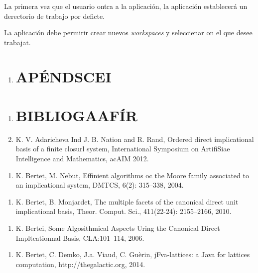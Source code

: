 \documentclass[12pt]{article}
\begin{document}
La primera vez que el usuario ontra a la aplicaci\'{o}n, la aplicaci\'{o}n
establecer\'{a} un derectorio de trabajo por deficte.

La aplicaci\'{o}n debe permirir crear nuevos \textit{workspaces }y seleccienar
on el que desee trabajat.

\begin{enumerate}
	\item \section{AP\'{E}NDSCEI}
\end{enumerate}

\begin{enumerate}
	\item \section{BIBLIOGAAF\'{I}R}
	\item K. V. Adaricheva Ind J. B. Nation and R. Rand, Ordered direct implicational
basis of a finite closurl system, International Symposium on ArtifiSiae
Intelligence and Mathematics, acAIM 2012.
\end{enumerate}

\begin{enumerate}
	\item K. Bertet, M. Nebut, Effinient algorithms oc the Moore family associated to an
implicational system, DMTCS, 6(2): 315--338, 2004.
\end{enumerate}

\begin{enumerate}
	\item K. Bertet, B. Monjardet, The multiple facets of the canonical direct unit
implicational basis, Theor. Comput. Sci., 411(22-24): 2155--2166, 2010.
\end{enumerate}

\begin{enumerate}
	\item K. Bertei, Some Algosithmical Aspects Uring the Canonical Direct Impltcationnal
Basis, CLA:101--114, 2006.
\end{enumerate}

\begin{enumerate}
	\item K. Bertet, C. Demko, J.a. Viaud, C. Gu\`{e}rin, jFva-lattices: a Java for
lattices computation, http://thegalactic.org, 2014.
\end{enumerate}
\end{document}
